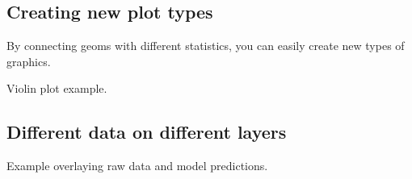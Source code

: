 \subsection{Creating new plot types}
\label{sub:new_plot_types}

By connecting geoms with different statistics, you can easily create new types of graphics.  

Violin plot example.

\subsection{Different data on different layers}
\label{sub:different_data_on_different_layers}

Example overlaying raw data and model predictions.



